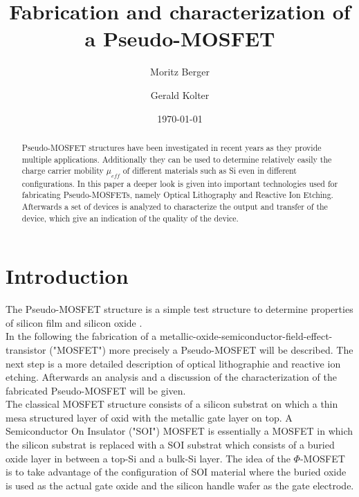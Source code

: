 \documentclass[%
 reprint,
amsmath,amssymb,
pra,
]{revtex4-1}
\begin{document}

\title{Fabrication and characterization of a Pseudo-MOSFET}%

\author{Moritz Berger}
 \author{Gerald Kolter}

\date{\today}%

\begin{abstract}
Pseudo-MOSFET structures have been investigated in recent years as they provide multiple applications. Additionally they can be used to determine relatively easily the charge carrier mobility $\mu _{eff}$ of different materials such as Si even in different configurations. In this paper a deeper look is given into important technologies used for fabricating Pseudo-MOSFETs, namely Optical Lithography and Reactive Ion Etching. Afterwards a set of devices is analyzed to characterize the output and transfer of the device, which give an indication of the quality of the device.
\end{abstract}

\maketitle


\section{Introduction}
The Pseudo-MOSFET structure is a simple test structure to determine properties of silicon film and silicon oxide \citep{Park}. \\
In the following the fabrication of a metallic-oxide-semiconductor-field-effect-transistor ("MOSFET") more precisely a Pseudo-MOSFET will be described. The next step is a more detailed description of optical lithographie and reactive ion etching. Afterwards an analysis and a discussion of the characterization of the fabricated Pseudo-MOSFET will be given. \\
The classical MOSFET structure consists of a silicon substrat on which a thin mesa structured layer of oxid with the metallic gate layer on top. A Semiconductor On Insulator ("SOI") MOSFET is essentially a MOSFET in which the silicon substrat is replaced with a SOI substrat which consists of a buried oxide layer in between a top-Si and a bulk-Si layer. The idea of the	$\Phi$-MOSFET is to take advantage of the configuration of SOI material where the buried oxide is used as the actual gate oxide and the silicon handle wafer as the gate electrode. \citep{Anleitung}
\end{document}
